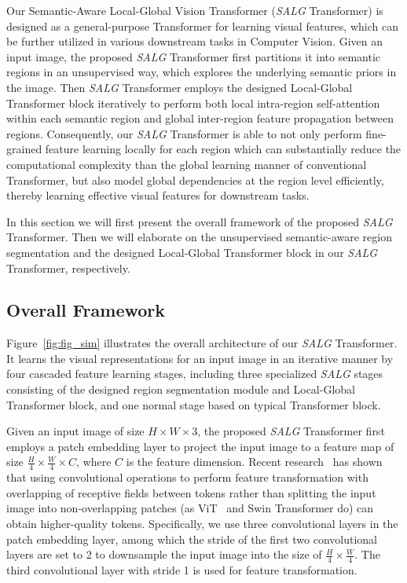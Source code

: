 



Our Semantic-Aware Local-Global Vision Transformer (\emph{SALG} Transformer) is designed as a general-purpose Transformer for learning visual features, which can be further utilized in various downstream tasks in Computer Vision. Given an input image, the proposed \emph{SALG} Transformer first partitions it into semantic regions in an unsupervised way, which explores the underlying semantic priors in the image. Then \emph{SALG} Transformer employs the designed Local-Global Transformer block iteratively to perform both local intra-region self-attention within each semantic region and global inter-region feature propagation between regions. Consequently, our \emph{SALG} Transformer is able to not only perform fine-grained feature learning locally for each region which can substantially reduce the computational complexity than the global learning manner of conventional Transformer, but also model global dependencies at the region level efficiently, thereby learning effective visual features for downstream tasks.

In this section we will first present the overall framework of the proposed \emph{SALG} Transformer. Then we will elaborate on the unsupervised semantic-aware region segmentation and the designed Local-Global Transformer block in our \emph{SALG} Transformer, respectively. 


\subsection{Overall Framework}
\label{sec:3.1}
Figure~\ref{fig:fig_sim} illustrates the overall architecture of our \emph{SALG} Transformer. It learns the visual representations for an input image in an iterative manner by four cascaded feature learning stages, including three specialized \emph{SALG} stages consisting of the designed region segmentation module and Local-Global Transformer block, and one normal stage based on typical Transformer block. 

Given an input image of size $H \times W \times 3$, the proposed \emph{SALG} Transformer first employs a patch embedding layer to project the input image to a feature map of size $\frac{H}{4} \times \frac{W}{4} \times C$, where $C$ is the feature dimension. Recent research~\cite{wang2021pyramid,wang2022scaled,ren2022shunted} has shown that using convolutional operations to perform feature transformation with overlapping of receptive fields between tokens rather than splitting the input image into non-overlapping patches (as ViT~\cite{dosovitskiy2020image} and Swin Transformer do) can obtain higher-quality tokens. Specifically, we use three convolutional layers in the patch embedding layer, among which the stride of the first two convolutional layers are set to 2 to downsample the input image into the size of $\frac{H}{4} \times \frac{W}{4}$. The third convolutional layer with stride 1 is used for feature transformation.


